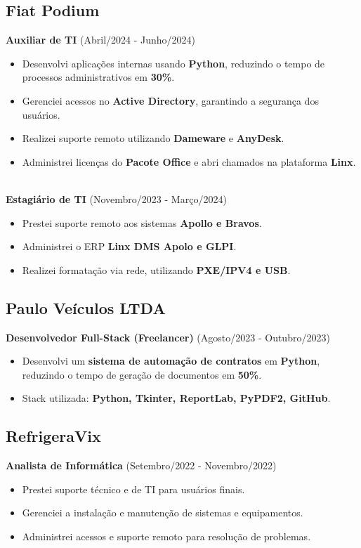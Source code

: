\documentclass[a4paper,10pt]{article}
\begin{document}
\subsection*{Fiat Podium}
\textbf{Auxiliar de TI} \hfill (Abril/2024 - Junho/2024)
\begin{itemize}
    \item Desenvolvi aplicações internas usando \textbf{Python}, reduzindo o tempo de processos administrativos em \textbf{30\%}.
    \item Gerenciei acessos no \textbf{Active Directory}, garantindo a segurança dos usuários.
    \item Realizei suporte remoto utilizando \textbf{Dameware} e \textbf{AnyDesk}.
    \item Administrei licenças do \textbf{Pacote Office} e abri chamados na plataforma \textbf{Linx}.
\end{itemize} 
\\
\textbf{Estagiário de TI} \hfill (Novembro/2023 - Março/2024)
\begin{itemize}
    \item Prestei suporte remoto aos sistemas \textbf{Apollo e Bravos}.
    \item Administrei o ERP \textbf{Linx DMS Apolo e GLPI}.
    \item Realizei formatação via rede, utilizando \textbf{PXE/IPV4 e USB}.
\end{itemize}

\subsection*{Paulo Veículos LTDA}
\textbf{Desenvolvedor Full-Stack (Freelancer)} \hfill (Agosto/2023 - Outubro/2023)
\begin{itemize}
    \item Desenvolvi um \textbf{sistema de automação de contratos} em \textbf{Python}, reduzindo o tempo de geração de documentos em \textbf{50\%}.
    \item Stack utilizada: \textbf{Python, Tkinter, ReportLab, PyPDF2, GitHub}.
\end{itemize}

\newpage
\subsection*{RefrigeraVix}
\textbf{Analista de Informática} \hfill (Setembro/2022 - Novembro/2022)
\begin{itemize}
    \item Prestei suporte técnico e de TI para usuários finais.
    \item Gerenciei a instalação e manutenção de sistemas e equipamentos.
    \item Administrei acessos e suporte remoto para resolução de problemas.
\end{itemize}
\end{document}
